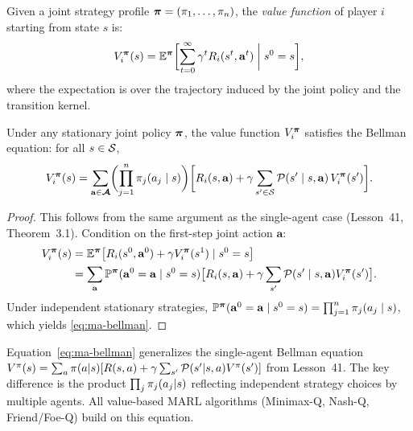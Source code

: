 \documentclass[11pt,a4paper]{article}
\begin{document}
\begin{definition}
\label{def:sg-value}
Given a joint strategy profile $\boldsymbol{\pi} = (\pi_1, \ldots,
\pi_n)$, the \emph{value function} of player $i$ starting from
state $s$ is:
\begin{equation}
\label{eq:sg-value}
  V_i^{\boldsymbol{\pi}}(s) = \mathbb{E}^{\boldsymbol{\pi}}\biggl[
    \sum_{t=0}^{\infty} \gamma^t R_i(s^t, \mathbf{a}^t)
    \;\bigg|\; s^0 = s
  \biggr],
\end{equation}
where the expectation is over the trajectory induced by the joint
policy and the transition kernel.
\end{definition}

\begin{theorem}
\label{thm:ma-bellman}
Under any stationary joint policy $\boldsymbol{\pi}$, the value function
$V_i^{\boldsymbol{\pi}}$ satisfies the Bellman equation: for all
$s \in \mathcal{S}$,
\begin{equation}
\label{eq:ma-bellman}
  V_i^{\boldsymbol{\pi}}(s)
  = \sum_{\mathbf{a} \in \boldsymbol{\mathcal{A}}}
    \biggl(\prod_{j=1}^{n} \pi_j(a_j \mid s)\biggr)
    \biggl[R_i(s, \mathbf{a}) + \gamma \sum_{s' \in \mathcal{S}}
      \mathcal{P}(s' \mid s, \mathbf{a}) \, V_i^{\boldsymbol{\pi}}(s')\biggr].
\end{equation}
\end{theorem}

\begin{proof}
This follows from the same argument as the single-agent case
(Lesson~41, Theorem~3.1).  Condition on the first-step joint action
$\mathbf{a}$:
\begin{align}
  V_i^{\boldsymbol{\pi}}(s)
  &= \mathbb{E}^{\boldsymbol{\pi}}\bigl[R_i(s^0, \mathbf{a}^0)
    + \gamma V_i^{\boldsymbol{\pi}}(s^1) \mid s^0 = s\bigr] \\
  &= \sum_{\mathbf{a}} \mathbb{P}^{\boldsymbol{\pi}}(\mathbf{a}^0 = \mathbf{a}
    \mid s^0 = s)
    \bigl[R_i(s, \mathbf{a}) + \gamma \sum_{s'}
    \mathcal{P}(s' \mid s, \mathbf{a}) V_i^{\boldsymbol{\pi}}(s')\bigr].
\end{align}
Under independent stationary strategies,
$\mathbb{P}^{\boldsymbol{\pi}}(\mathbf{a}^0 = \mathbf{a} \mid s^0 = s) =
\prod_{j=1}^n \pi_j(a_j \mid s)$, which yields
\eqref{eq:ma-bellman}.
\end{proof}

\begin{rlconnection}[title={From MDP Bellman to Multi-Agent Bellman}]
Equation~\eqref{eq:ma-bellman} generalizes the single-agent Bellman
equation $V^{\pi}(s) = \sum_a \pi(a|s)[R(s,a) + \gamma
\sum_{s'} \mathcal{P}(s'|s,a)V^{\pi}(s')]$ from Lesson~41.  The key
difference is the product $\prod_j \pi_j(a_j|s)$ reflecting
independent strategy choices by multiple agents.  All value-based MARL
algorithms (Minimax-Q, Nash-Q, Friend/Foe-Q) build on this equation.
\end{rlconnection}
\end{document}

